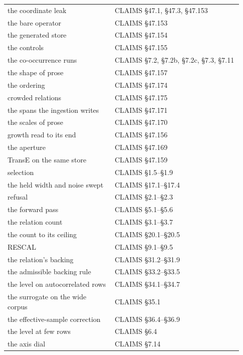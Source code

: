 \documentclass[10pt,letterpaper,twocolumn]{article}
\begin{document}
\begin{center}
{\footnotesize
{}
\tabletail{\midrule}
\tablelasttail{\bottomrule}
\begin{xtabular}{L{0.426\linewidth}L{0.505\linewidth}}
the coordinate leak & CLAIMS §47.1, §47.3, §47.153 \\
the bare operator & CLAIMS §47.153 \\
the generated store & CLAIMS §47.154 \\
the controls & CLAIMS §47.155 \\
the co-occurrence runs & CLAIMS §7.2, §7.2b, §7.2c, §7.3, §7.11 \\
the shape of prose & CLAIMS §47.157 \\
the ordering & CLAIMS §47.174 \\
crowded relations & CLAIMS §47.175 \\
the spans the ingestion writes & CLAIMS §47.171 \\
the scales of prose & CLAIMS §47.170 \\
growth read to its end & CLAIMS §47.156 \\
the aperture & CLAIMS §47.169 \\
TransE on the same store & CLAIMS §47.159 \\
selection & CLAIMS §1.5--§1.9 \\
the held width and noise swept & CLAIMS §17.1--§17.4 \\
refusal & CLAIMS §2.1--§2.3 \\
the forward pass & CLAIMS §5.1--§5.6 \\
the relation count & CLAIMS §3.1--§3.7 \\
the count to its ceiling & CLAIMS §20.1--§20.5 \\
RESCAL & CLAIMS §9.1--§9.5 \\
the relation's backing & CLAIMS §31.2--§31.9 \\
the admissible backing rule & CLAIMS §33.2--§33.5 \\
the level on autocorrelated rows & CLAIMS §34.1--§34.7 \\
the surrogate on the wide corpus & CLAIMS §35.1 \\
the effective-sample correction & CLAIMS §36.4--§36.9 \\
the level at few rows & CLAIMS §6.4 \\
the axis dial & CLAIMS §7.14 \\

\end{xtabular}}
\end{center}
\end{document}
